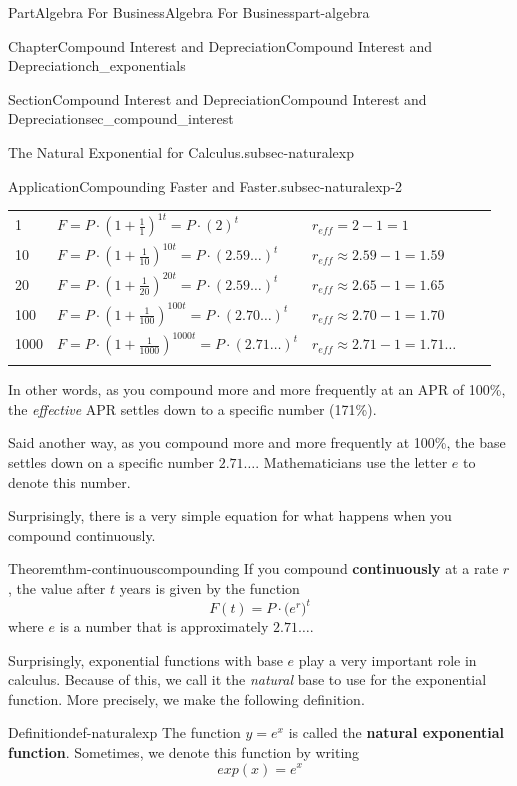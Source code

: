 \documentclass{tufte-book}
\newcommand{\terminology}[1]{\textbf{#1}}
\numberwithin{equation}{chapter}
\newcommand{\hrulemedium}{\noalign{\hrule height 0.07em}}
\begin{document}
\begin{partptx}{Part}{Algebra For Business}{}{Algebra For Business}{}{}{part-algebra}
\begin{chapterptx}{Chapter}{Compound Interest and Depreciation}{}{Compound Interest and Depreciation}{}{}{ch_exponentials}
\begin{sectionptx}{Section}{Compound Interest and Depreciation}{}{Compound Interest and Depreciation}{}{}{sec_compound_interest}
\begin{paragraphs}{The Natural Exponential for Calculus.}{subsec-naturalexp}
\begin{insight}{Application}{Compounding Faster and Faster.}{subsec-naturalexp-2}
\begin{center}
{\begin{tabular}{lBlBl}
1&\(F = P\cdot(1+\frac{1}{1})^{1t} = P\cdot (2)^t\)&\(r_{eff} = 2- 1 = 1\)\tabularnewline\hrulemedium
10&\(F = P\cdot(1+\frac{1}{10})^{10t} = P\cdot (2.59\dots)^t\)&\(r_{eff} \approx 2.59-1 = 1.59\)\tabularnewline\hrulemedium
20&\(F = P\cdot(1+\frac{1}{20})^{20t} = P\cdot (2.59\dots)^t\)&\(r_{eff}\approx 2.65-1 = 1.65\)\tabularnewline\hrulemedium
100&\(F = P\cdot(1+\frac{1}{100})^{100t} = P\cdot (2.70\dots)^t\)&\(r_{eff}\approx 2.70-1 = 1.70\)\tabularnewline\hrulemedium
1000&\(F = P\cdot(1+\frac{1}{1000})^{1000t} = P\cdot (2.71\dots)^t\)&\(r_{eff}\approx 2.71-1=1.71\dots\)\tabularnewline\hrulemedium
\end{tabular}
}%
\end{center}%
In other words, as you compound more and more frequently at an APR of 100\%, the \emph{effective} APR settles down to a specific number (171\%).%
\par
Said another way, as you compound more and more frequently at 100\%, the base settles down on a specific number \(2.71\dots\). Mathematicians use the letter \(e\) to denote this number.%
\end{insight}
Surprisingly, there is a very simple equation for what happens when you compound continuously.%
\begin{theorem}{Theorem}{}{}{thm-continuouscompounding}%
If you compound \terminology{continuously} at a rate \(r\), the value after \(t\) years is given by the function%
\begin{equation*}
F(t) = P\cdot \Big(e^r\Big)^t
\end{equation*}
where \(e\) is a number that is approximately \(2.71\dots\).%
\end{theorem}
Surprisingly, exponential functions with base \(e\) play a very important role in calculus.  Because of this, we call it the \emph{natural} base to use for the exponential function.  More precisely, we make the following definition.%
\begin{definition}{Definition}{}{def-naturalexp}%
The function \(y = e^{x}\) is called the \terminology{natural exponential function}.  Sometimes, we denote this function by writing%
\begin{equation*}
exp(x) = e^x
\end{equation*}
%
\end{definition}
\end{paragraphs}%
\end{sectionptx}
\end{chapterptx}
%
\typeout{************************************************}

\end{partptx}
\end{document}
